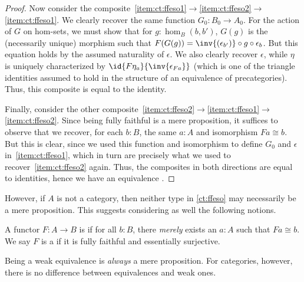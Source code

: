 \begin{proof}
  Now consider the composite~\ref{item:ct:ffeso1}$\to$\ref{item:ct:ffeso2}$\to$\ref{item:ct:ffeso1}.
  We clearly recover the same function $G_0:B_0 \to A_0$.
  For the action of $G$ on hom-sets, we must show that for $g:\hom_B(b,b')$, $G(g)$ is the (necessarily unique) morphism such that $F(G(g)) = \inv{(\epsilon_{b'})}\circ g \circ \epsilon_b$.
  But this equation holds by the assumed naturality of $\epsilon$.
  We also clearly recover $\epsilon$, while $\eta$ is uniquely characterized by $\id{F\eta_a}{\inv{\epsilon_{Fa}}}$ (which is one of the triangle identities assumed to hold in the structure of an equivalence of precategories).
  Thus, this composite is equal to the identity.

  Finally, consider the other composite~\ref{item:ct:ffeso2}$\to$\ref{item:ct:ffeso1}$\to$\ref{item:ct:ffeso2}.
  Since being fully faithful is a mere proposition, it suffices to observe that we recover, for each $b:B$, the same $a:A$ and isomorphism $F a \cong b$.
  But this is clear, since we used this function and isomorphism to define $G_0$ and $\epsilon$ in~\ref{item:ct:ffeso1}, which in turn are precisely what we used to recover~\ref{item:ct:ffeso2} again.
  Thus, the composites in both directions are equal to identities, hence we have an equivalence \eqv{\text{\ref{item:ct:ffeso1}}}{\text{\ref{item:ct:ffeso2}}}.
\end{proof}

However, if $A$ is not a category, then neither type in \cref{ct:ffeso} may necessarily be a mere proposition.
This suggests considering as well the following notions.

\begin{defn}\label{ct:essentially-surjective}
  A functor $F:A\to B$ is 
  if for all $b:B$, there \emph{merely} exists an $a:A$ such that $Fa\cong b$.
  We say $F$ is a 
  if it is fully faithful and essentially surjective.
\end{defn}

Being a weak equivalence is \emph{always} a mere proposition.
For categories, however, there is no difference between equivalences and weak ones.

